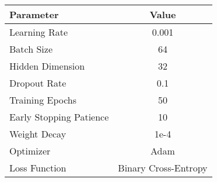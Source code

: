 \documentclass{article}
\theoremstyle{plain}
\theoremstyle{definition}
\theoremstyle{remark}
\begin{document}
\begin{center}
\begin{tabular}{lc}
\toprule
Parameter & Value \\
\midrule
Learning Rate & 0.001 \\
Batch Size & 64 \\
Hidden Dimension & 32 \\
Dropout Rate & 0.1 \\
Training Epochs & 50 \\
Early Stopping Patience & 10 \\
Weight Decay & 1e-4 \\
Optimizer & Adam \\
Loss Function & Binary Cross-Entropy \\
\bottomrule
\end{tabular}
\end{center}
\end{document}
